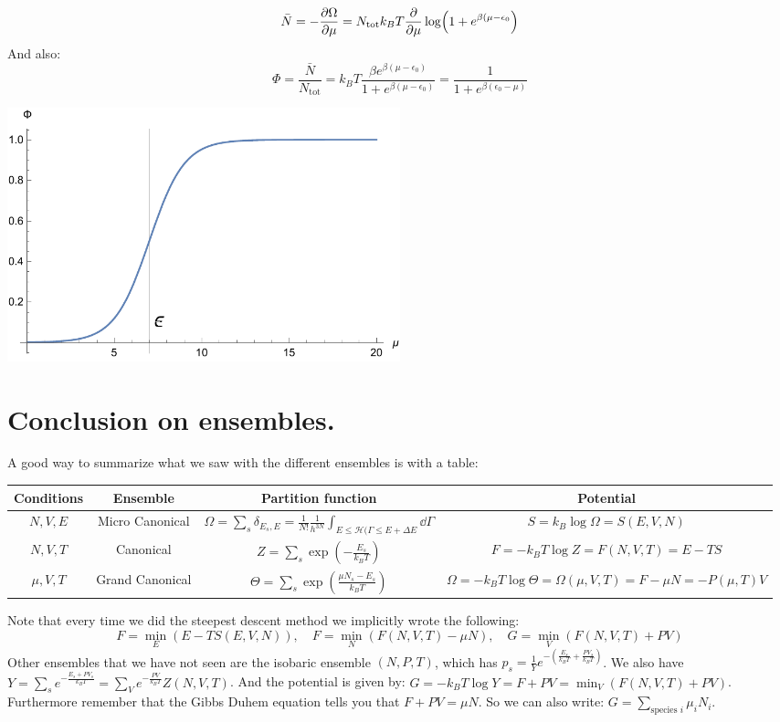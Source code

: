 \documentclass[10pt,a4paper]{book}
\begin{document}
\[
\bar{N} = - \pdv{\Omega}{\mu} = N_\text{tot} k_B T \pdv{}{\mu} \log(1 + e^{\beta(\mu - \epsilon_0})
\]
And also:
\[
\Phi = \frac{\bar{N}}{N_\text{tot}} = k_B T \frac{\beta e^{\beta(\mu - \epsilon_0)}}{1 + e^{\beta(\mu - \epsilon_0)}} = \frac{1}{1 + e^{\beta(\epsilon_0 - \mu)}}
\]
\begin{center}
	    \includegraphics[width=0.5\textwidth]{graphs/plot_surface}
\end{center}

\section{Conclusion on ensembles.}
A good way to summarize what we saw with the different ensembles is with a table:
\begin{center}

\begin{adjustbox}{max width=\textwidth}
\begin{tabular}{|c|c|c|c|}
\hline
Conditions & Ensemble & Partition function & Potential\\
\hline
$N, V, E$ & Micro Canonical & $\Omega = \sum_s \delta_{E_s, E} = \frac{1}{N!}\frac{1}{h^{3N}}\int_{E \leq \mathcal{H(\Gamma} \leq E + \Delta E} \dd \Gamma$ & $S = k_B \log \Omega = S(E, V, N)$\\
\hline
$N,V,T$ & Canonical & $ Z = \sum_s \exp(-\frac{E_s}{k_B T})$ & $ F = - k_B T \log Z = F(N, V, T) = E - TS$\\
\hline
$\mu, V, T$ & Grand Canonical & $\Theta = \sum_s \exp(\frac{\mu N_s - E_s}{k_B T})$ & $\Omega = -k_B T \log \Theta = \Omega(\mu, V, T) = F - \mu N = - P(\mu, T)V$\\
\hline
\end{tabular}
\end{adjustbox}
\end{center}
Note that every time we did the steepest descent method we implicitly wrote the following:
\[
F = \min_E \left( E - T S(E, V, N)\right),\quad F = \min_N \left(F(N,V,T) - \mu N\right), \quad G = \min_V \left( F(N,V,T) + PV\right)
\]
Other ensembles that we have not seen are the isobaric ensemble $(N, P, T)$, which has $p_s = \frac{1}{Y} e^{- \left(\frac{E_s}{k_B T} + \frac{P V_s}{k_B T}\right)}$. We also have $Y = \sum_s e^{-\frac{E_s + P V_s}{k_B T}} = \sum_V e^{-\frac{P V}{k_B T}} Z(N, V, T)$. And the potential is given by: $G = -k_B T \log Y= F + PV = \min_V (F(N, V, T) + PV)$. Furthermore remember that the Gibbs Duhem equation tells you that $F + PV = \mu N$. So we can also write: $G = \sum_{\text{species } i} \mu_i N_i$.
\end{document}
